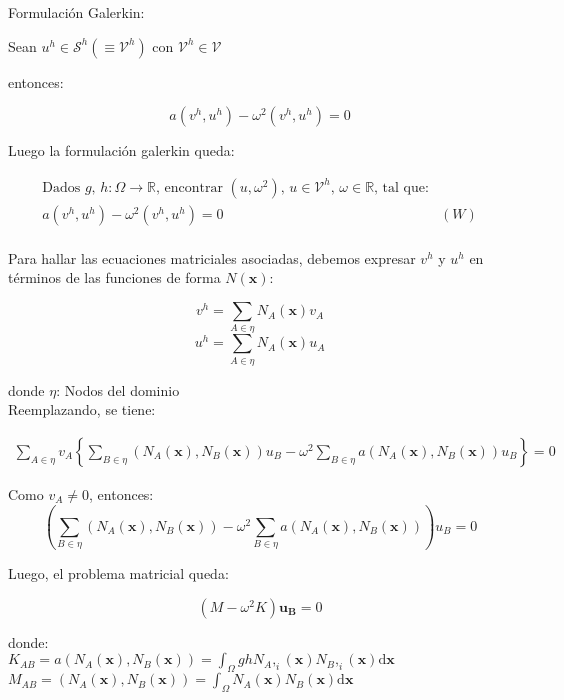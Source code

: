 Formulaci\'on Galerkin:

Sean $u^h \in \mathcal{S}^h \left( \equiv \mathcal{V}^h \right)$ con $\mathcal{V}^h \in \mathcal{V}$

entonces:

$$ a(v^h, u^h) - \omega^2 (v^h, u^h) = 0 $$

Luego la formulaci\'on galerkin queda:

\begin{align*}
\text{Dados $g$, $h: \Omega \rightarrow \mathbb{R}$, encontrar $(u, \omega^2)$, $u \in \mathcal{V}^h $, $\omega \in \mathbb{R}$, tal que:}\\
a(v^h, u^h) - \omega^2 (v^h, u^h) = 0 \ \ \ \ \  & (W) \\
\end{align*}

Para hallar las ecuaciones matriciales asociadas, debemos expresar $v^h$ y $u^h$ en t\'erminos de las funciones de forma $N(\boldsymbol{x})$:

$$v^h = \sum_{A \in \eta}N_A(\boldsymbol{x})v_A$$
$$u^h = \sum_{A \in \eta}N_A(\boldsymbol{x})u_A$$

donde 
$\eta$: Nodos del dominio\\

Reemplazando, se tiene:

\begin{equation*}
\begin{split}
\sum_{A \in \eta} v_A 
\left \{
\sum_{B \in \eta}(N_A(\boldsymbol{x}), N_B(\boldsymbol{x})) u_B - 
\omega^2 \sum_{B \in \eta} a(N_A(\boldsymbol{x}), N_B(\boldsymbol{x})) u_B 
\right \} = 0
\end{split}
\end{equation*}

Como $v_A \neq 0$, entonces:
$$\left( \sum_{B \in \eta}(N_A(\boldsymbol{x}), N_B(\boldsymbol{x})) - 
\omega^2 \sum_{B \in \eta} a(N_A(\boldsymbol{x}), N_B(\boldsymbol{x}))\right) u_B =0 $$

Luego, el problema matricial queda:

$$(M - \omega^2 K)\boldsymbol{u_B} = 0$$

donde:\\

$K_{AB} = a(N_A(\boldsymbol{x}), N_B(\boldsymbol{x})) = \int_{\Omega} gh N_A,_i(\boldsymbol{x}) N_B,_i(\boldsymbol{x}) \mathrm{d}\boldsymbol{x} $\\

$M_{AB} = (N_A(\boldsymbol{x}), N_B(\boldsymbol{x})) = \int_{\Omega} N_A(\boldsymbol{x}) N_B(\boldsymbol{x}) \mathrm{d}\boldsymbol{x} $\\

